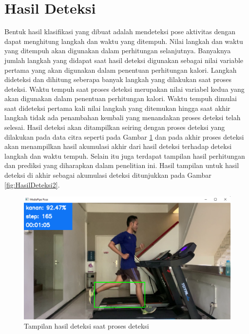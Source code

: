 \section{Hasil Deteksi}
\label{sec:HasilDeteksi}

Bentuk hasil klasifikasi yang dibuat adalah mendeteksi pose aktivitas dengan dapat menghitung langkah dan waktu yang ditempuh. Nilai langkah dan waktu yang ditempuh akan digunakan dalam perhitungan selanjutnya. Banyaknya jumlah langkah yang didapat saat hasil deteksi digunakan sebagai nilai variable pertama yang akan digunakan dalam penentuan perhitungan kalori. Langkah dideteksi dan dihitung seberapa banyak langkah yang dilakukan saat proses deteksi. Waktu tempuh saat proses deteksi merupakan nilai variabel kedua yang akan digunakan dalam penentuan perhitungan kalori. Waktu tempuh dimulai saat dideteksi pertama kali nilai langkah yang ditemukan hingga saat akhir langkah tidak ada penambahan kembali yang menandakan proses deteksi telah selesai. Hasil deteksi akan ditampilkan seiring dengan proses deteksi yang dilakukan pada data citra seperti pada Gambar \ref{fig:HasilDeteksi} dan pada akhir proses deteksi akan menampilkan hasil akumulasi akhir dari hasil deteksi terhadap deteksi langkah dan waktu tempuh. Selain itu juga terdapat tampilan hasil perhitungan dan prediksi yang diharapkan dalam penelitian ini. Hasil tampilan untuk hasil deteksi di akhir sebagai akumulasi deteksi ditunjukkan pada Gambar \ref{fig:HasilDeteksi2}.

\begin{figure}[H]
  \centering
  \includegraphics[scale=0.48]{gambar/hasil deteksi.png}
  \caption{Tampilan hasil deteksi saat proses deteksi}
  \label{fig:HasilDeteksi}
\end{figure}

